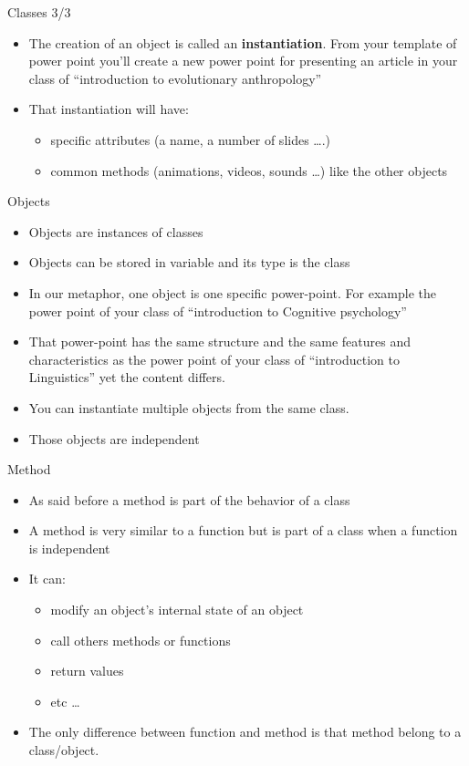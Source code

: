 \documentclass[
  8pt,
  ignorenonframetext,
]{beamer}
\providecommand{\tightlist}{%
  \setlength{\itemsep}{0pt}\setlength{\parskip}{0pt}}
\begin{document}
\begin{frame}{Classes 3/3}
\protect\hypertarget{classes-33}{}
\begin{itemize}
\item
  The creation of an object is called an \textbf{instantiation}. From
  your template of power point you'll create a new power point for
  presenting an article in your class of ``introduction to evolutionary
  anthropology''
\item
  That instantiation will have:

  \begin{itemize}
  \tightlist
  \item
    specific attributes (a name, a number of slides \ldots.)
  \item
    common methods (animations, videos, sounds \ldots) like the other
    objects
  \end{itemize}
\end{itemize}
\end{frame}

\begin{frame}{Objects}
\protect\hypertarget{objects}{}
\begin{itemize}
\item
  Objects are instances of classes
\item
  Objects can be stored in variable and its type is the class
\item
  In our metaphor, one object is one specific power-point. For example
  the power point of your class of ``introduction to Cognitive
  psychology''
\item
  That power-point has the same structure and the same features and
  characteristics as the power point of your class of ``introduction to
  Linguistics'' yet the content differs.
\item
  You can instantiate multiple objects from the same class.
\item
  Those objects are independent
\end{itemize}
\end{frame}

\begin{frame}{Method}
\protect\hypertarget{method}{}
\begin{itemize}
\item
  As said before a method is part of the behavior of a class
\item
  A method is very similar to a function but is part of a class when a
  function is independent
\item
  It can:

  \begin{itemize}
  \tightlist
  \item
    modify an object's internal state of an object
  \item
    call others methods or functions
  \item
    return values
  \item
    etc \ldots{}
  \end{itemize}
\item
  The only difference between function and method is that method belong
  to a class/object.
\end{itemize}
\end{frame}
\end{document}
